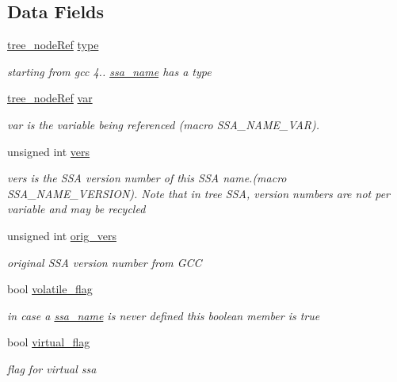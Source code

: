 \subsection*{Data Fields}
\begin{DoxyCompactItemize}
\item 
\hyperlink{tree__node_8hpp_a6ee377554d1c4871ad66a337eaa67fd5}{tree\+\_\+node\+Ref} \hyperlink{structssa__name_adcc5d4b577bfdad6e2bfc7d869b78e5a}{type}
\begin{DoxyCompactList}\small\item\em starting from gcc 4.. \hyperlink{structssa__name}{ssa\+\_\+name} has a type \end{DoxyCompactList}\item 
\hyperlink{tree__node_8hpp_a6ee377554d1c4871ad66a337eaa67fd5}{tree\+\_\+node\+Ref} \hyperlink{structssa__name_abe02043dd18cda911f44c46c0118ec38}{var}
\begin{DoxyCompactList}\small\item\em var is the variable being referenced (macro S\+S\+A\+\_\+\+N\+A\+M\+E\+\_\+\+V\+AR). \end{DoxyCompactList}\item 
unsigned int \hyperlink{structssa__name_a93fb1ab48189c4da88ebe11db35bcca0}{vers}
\begin{DoxyCompactList}\small\item\em vers is the S\+SA version number of this S\+SA name.(macro S\+S\+A\+\_\+\+N\+A\+M\+E\+\_\+\+V\+E\+R\+S\+I\+ON). Note that in tree S\+SA, version numbers are not per variable and may be recycled \end{DoxyCompactList}\item 
unsigned int \hyperlink{structssa__name_a5921a9a9eb6d6718609fe3bfb47a6304}{orig\+\_\+vers}
\begin{DoxyCompactList}\small\item\em original S\+SA version number from G\+CC \end{DoxyCompactList}\item 
bool \hyperlink{structssa__name_aa0898d91cc7af0af67605f26f0690a64}{volatile\+\_\+flag}
\begin{DoxyCompactList}\small\item\em in case a \hyperlink{structssa__name}{ssa\+\_\+name} is never defined this boolean member is true \end{DoxyCompactList}\item 
bool \hyperlink{structssa__name_a611055d0551fb675824a7602906567f3}{virtual\+\_\+flag}
\begin{DoxyCompactList}\small\item\em flag for virtual ssa \end{DoxyCompactList}\item 

\end{DoxyCompactItemize}

